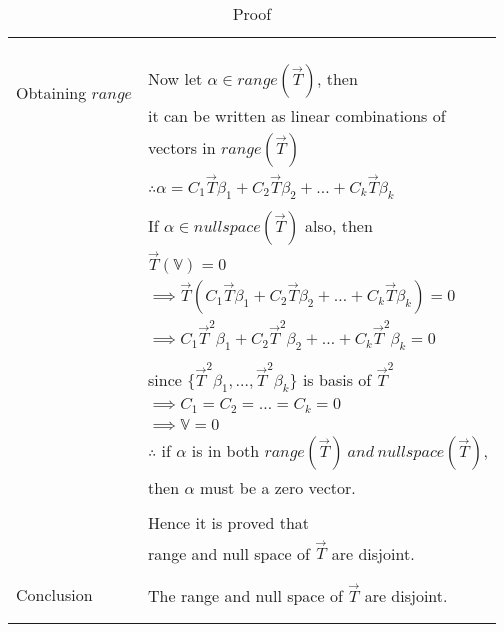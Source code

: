 \begin{longtable}{|l|l|}
& \\
& \\
& \\
\hline
\multirow{3}{*}{Obtaining $range $} & \\
& Now let $\alpha \in range(\vec{T})$, then\\
$ and \  nullspace \  of \  \vec{T}$
& it can be written as linear combinations of \\
& vectors in $ range(\vec{T})$\\
& $\therefore \alpha = C_1\vec{T}\beta_1+C_2\vec{T}\beta_2+\ldots+C_k\vec{T}\beta_k$\\
& \\
& If $\alpha \in null space (\vec{T})$ also, then\\
& $ \vec{T}(\mathbb{V}) = 0$\\
& $\implies \vec{T}(C_1\vec{T}\beta_1+C_2\vec{T}\beta_2+\ldots+C_k\vec{T}\beta_k) = 0$\\
& $ \implies C_1\vec{T}^2\beta_1+C_2\vec{T}^2\beta_2+\ldots+C_k\vec{T}^2\beta_k = 0$\\
& \\
& since $\lbrace \vec{T}^2\beta_1,\ldots,\vec{T}^2\beta_k \rbrace$ is basis of $\vec{T}^2$\\
& $\implies C_1 = C_2 = \ldots = C_k = 0$\\
& $\implies \mathbb{V} = 0$\\
& $\therefore$ if $\alpha$  is in both $ range(\vec{T}) \  and \  null space(\vec{T})$, \\
& then $\alpha$ must be a zero vector.\\
& \\
& Hence it is proved that \\
& range and null space of $\vec{T}$ are disjoint.\\
&\\
\hline
\multirow{3}{*}{Conclusion} & \\
& The range and null space of $\vec{T}$ are disjoint.\\
&\\
\hline
\caption{Proof}
\label{eq:solutions/3/2/11/table:1}
\end{longtable}
